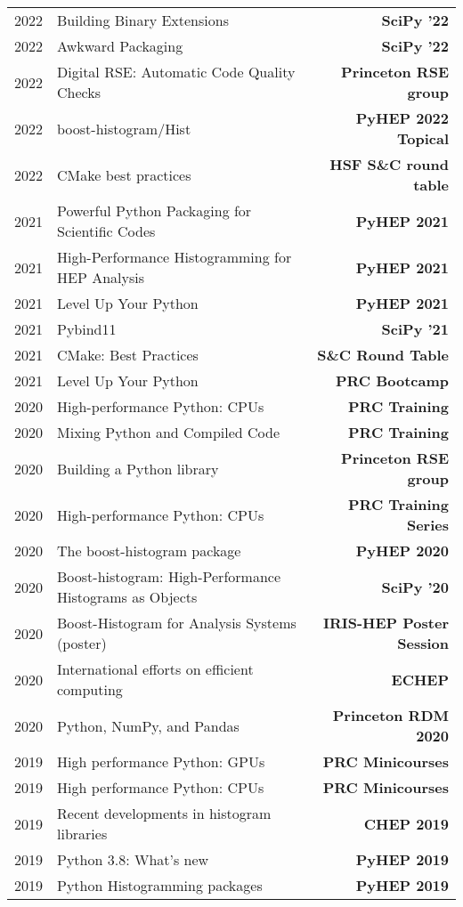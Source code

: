 \documentclass[10pt,letterpaper]{moderncv}
\begin{document}

\begin{tabularx}{\textwidth}{p{.33in}X>{\bfseries}r}
    2022 & Building Binary Extensions & SciPy '22 \\
    2022 & Awkward Packaging & SciPy '22 \\
    2022 & Digital RSE: Automatic Code Quality Checks & Princeton RSE group \\
    2022 & boost-histogram/Hist & PyHEP 2022 Topical \\
    2022 & CMake best practices & HSF S\&C round table \\
	2021 & Powerful Python Packaging for Scientific Codes & PyHEP 2021 \\
	2021 & High-Performance Histogramming for HEP Analysis & PyHEP 2021 \\
	2021 & Level Up Your Python & PyHEP 2021 \\
	2021 & Pybind11 & SciPy '21 \\
    2021 & CMake: Best Practices & S\&C Round Table \\
    2021 & Level Up Your Python & PRC Bootcamp \\
    2020 & High-performance Python: CPUs & PRC Training \\
    2020 & Mixing Python and Compiled Code & PRC Training \\
    2020 & Building a Python library & Princeton RSE group \\
    2020 & High-performance Python: CPUs & PRC Training Series \\
    2020 & The boost-histogram package & PyHEP 2020 \\
    2020 & Boost-histogram: High-Performance Histograms as Objects & SciPy '20 \\
    2020 & Boost-Histogram for Analysis Systems (poster) & IRIS-HEP Poster Session \\
    2020 & International efforts on efficient computing & ECHEP \\
    2020 & Python, NumPy, and Pandas & Princeton RDM 2020 \\
    2019 & High performance Python: GPUs & PRC Minicourses \\
    2019 & High performance Python: CPUs & PRC Minicourses \\
    2019 & Recent developments in histogram libraries  & CHEP 2019 \\
    2019 & Python 3.8: What's new & PyHEP 2019 \\
    2019 & Python Histogramming packages & PyHEP 2019\\

\end{tabularx}
\end{document}

